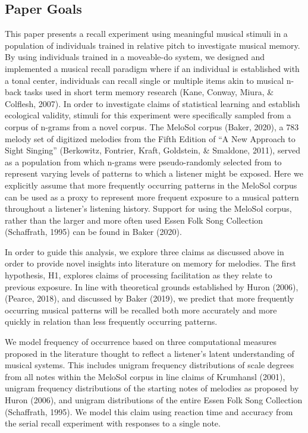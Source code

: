 \documentclass[english,man]{apa6}
\begin{document}
\hypertarget{paper-goals}{%
\subsection{Paper Goals}\label{paper-goals}}

This paper presents a recall experiment using meaningful musical stimuli in a population of individuals trained in relative pitch to investigate musical memory.
By using individuals trained in a moveable-do system, we designed and implemented a musical recall paradigm where if an individual is established with a tonal center, individuals can recall single or multiple items akin to musical n-back tasks used in short term memory research (Kane, Conway, Miura, \& Colflesh, 2007).
In order to investigate claims of statistical learning and establish ecological validity, stimuli for this experiment were specifically sampled from a corpus of n-grams from a novel corpus.
The MeloSol corpus (Baker, 2020), a 783 melody set of digitized melodies from the Fifth Edition of \enquote{A New Approach to Sight Singing} (Berkowitz, Fontrier, Kraft, Goldstein, \& Smaldone, 2011), served as a population from which n-grams were pseudo-randomly selected from to represent varying levels of patterns to which a listener might be exposed.
Here we explicitly assume that more frequently occurring patterns in the MeloSol corpus can be used as a proxy to represent more frequent exposure to a musical pattern throughout a listener's listening history. Support for using the MeloSol corpus, rather than the larger and more often used Essen Folk Song Collection (Schaffrath, 1995) can be found in Baker (2020).

In order to guide this analysis, we explore three claims as discussed above in order to provide novel insights into literature on memory for melodies.
The first hypothesis, H1, explores claims of processing facilitation as they relate to previous exposure.
In line with theoretical grounds established by Huron (2006), (Pearce, 2018), and discussed by Baker (2019), we predict that more frequently occurring musical patterns will be recalled both more accurately and more quickly in relation than less frequently occurring patterns.

We model frequency of occurrence based on three computational measures proposed in the literature thought to reflect a listener's latent understanding of musical systems.
This includes unigram frequency distributions of scale degrees from all notes within the MeloSol corpus in line claims of Krumhansl (2001), unigram frequency distributions of the starting notes of melodies as proposed by Huron (2006), and unigram distributions of the entire Essen Folk Song Collection (Schaffrath, 1995).
We model this claim using reaction time and accuracy from the serial recall experiment with responses to a single note.
\end{document}
